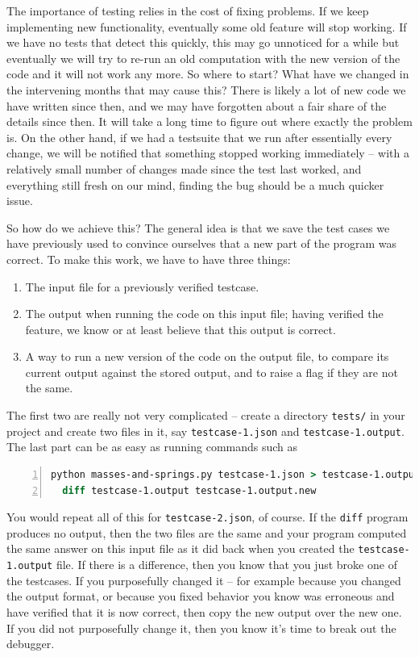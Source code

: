 \documentclass{article}
\begin{document}
The importance of testing relies in the cost of fixing problems. If we keep
implementing new functionality, eventually some old feature will stop
working. If we have no tests that detect this quickly, this may go unnoticed
for a while but eventually we will try to re-run an old computation with the
new version of the code and it will not work any more. So where to start? What
have we changed in the intervening months that may cause this? There is likely
a lot of new code we have written since then, and we may have forgotten about
a fair share of the details since then. It will take a long time to figure out
where exactly the problem is. On the other hand, if we had a testsuite that we
run after essentially every change, we will be notified that something stopped
working immediately -- with a relatively small number of changes made since
the test last worked, and everything still fresh on our mind, finding the bug
should be a much quicker issue.

So how do we achieve this? The general idea is that we save the test cases we
have previously used to convince ourselves that a new part of the program was
correct. To make this work, we have to have three things:
\begin{enumerate}
\item The input file for a previously verified testcase.
\item The output when running the code on this input file; having verified the
  feature, we know or at least believe that this output is correct.
\item A way to run a new version of the code on the output file, to compare
  its current output against the stored output, and to raise a flag if they
  are not the same.
\end{enumerate}
The first two are really not very complicated -- create a directory
\texttt{tests/} in your project and create two files in it, say
\texttt{testcase-1.json} and \texttt{testcase-1.output}. The last part can
be as easy as running commands such as
\begin{lstlisting}[frame=single,basicstyle=\footnotesize,numbers=left,language=csh]
  python masses-and-springs.py testcase-1.json > testcase-1.output.new
  diff testcase-1.output testcase-1.output.new
\end{lstlisting}
You would repeat all of this for \texttt{testcase-2.json}, of course.
If the \texttt{diff} program produces no output, then the two files are the
same and your program computed the same answer on this input file as it did
back when you created the \texttt{testcase-1.output} file. If there is a
difference, then you know that you just broke one of the testcases. If you
purposefully changed it -- for example because you changed the output format,
or because you fixed behavior you know was erroneous and have verified that it
is now correct, then copy the new output over the new one. If you did not
purposefully change it, then you know it's time to break out the debugger.
\end{document}
